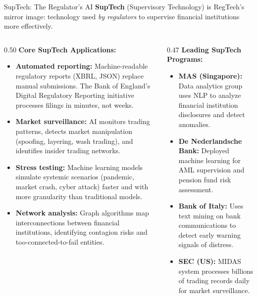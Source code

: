\begin{frame}{SupTech: The Regulator's AI}
  \textbf{SupTech} (Supervisory Technology) is RegTech's mirror image: technology
  used \textit{by regulators} to supervise financial institutions more
  effectively.

  \vspace{0.5em}
  \begin{columns}[T]
    \begin{column}{0.50\textwidth}
      \textcolor{mlpurple}{\textbf{Core SupTech Applications:}}
      \begin{itemize}
        \item \textbf{Automated reporting:} Machine-readable regulatory
              reports (XBRL, JSON) replace manual submissions. The Bank of
              England's Digital Regulatory Reporting initiative processes
              filings in minutes, not weeks.
        \item \textbf{Market surveillance:} AI monitors trading patterns,
              detects market manipulation (spoofing, layering, wash trading),
              and identifies insider trading networks.
        \item \textbf{Stress testing:} Machine learning models simulate
              systemic scenarios (pandemic, market crash, cyber attack) faster
              and with more granularity than traditional models.
        \item \textbf{Network analysis:} Graph algorithms map interconnections
              between financial institutions, identifying contagion risks and
              too-connected-to-fail entities.
      \end{itemize}
    \end{column}
    \begin{column}{0.47\textwidth}
      \textcolor{mlpurple}{\textbf{Leading SupTech Programs:}}
      \begin{itemize}
        \item \textbf{MAS (Singapore):} Data analytics group uses NLP to
              analyze financial institution disclosures and detect anomalies.
        \item \textbf{De Nederlandsche Bank:} Deployed machine learning for
              AML supervision and pension fund risk assessment.
        \item \textbf{Bank of Italy:} Uses text mining on bank communications
              to detect early warning signals of distress.
        \item \textbf{SEC (US):} MIDAS system processes billions of trading
              records daily for market surveillance.
      \end{itemize}


\end{column}
\end{columns}
\end{frame}
